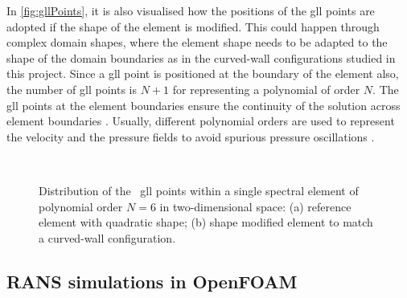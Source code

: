 In \autoref{fig:gllPoints}, it is also visualised how the positions of the \acrshort{gll} points are adopted if the shape of the element is modified.
This could happen through complex domain shapes, where the element shape needs to be adapted to the shape of the domain boundaries as in the curved-wall configurations studied in this project.
Since a \acrshort{gll} point is positioned at the boundary of the element also, the number of \acrshort{gll} points is $N+1$ for representing a polynomial of order $N$.
The \acrshort{gll} points at the element boundaries ensure the continuity of the solution across element boundaries \citep{deville_high-order_2002}.
Usually, different polynomial orders are used to represent the velocity and the pressure fields to avoid spurious pressure oscillations \citep{maday_spectral_1989}.

\begin{figure}[h!]
    \centering
    
    \\[-15pt]
    \caption[Distribution of GLL points on a curved spectral element]{%
    Distribution of the \gllmark~\acrshort{gll} points within a single
    spectral element of polynomial order $N=6$ in two-dimensional space: (a) reference element with quadratic shape; (b) shape modified element to match a curved-wall configuration.}
    \label{fig:gllPoints}
\end{figure}


\subsection{RANS simulations in OpenFOAM}\label{sec:RANSmethod}

